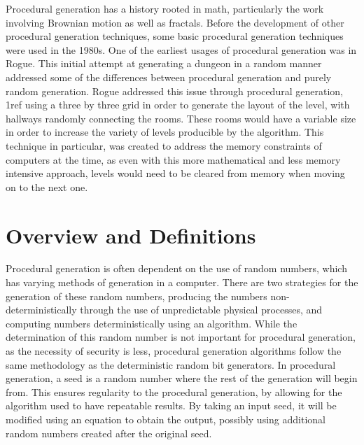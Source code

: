 \documentclass[10pt]{report}
\begin{document}
		Procedural generation has a history rooted in math, particularly the work involving Brownian motion as well as fractals. Before the development of other procedural generation techniques, some basic procedural generation techniques were used in the 1980s. One of the earliest usages of procedural generation was in Rogue. This initial attempt at generating a dungeon in a random manner addressed some of the differences between procedural generation and purely random generation. Rogue addressed this issue through procedural generation, 1ref using a three by three grid in order to generate the layout of the level, with hallways randomly connecting the rooms. These rooms would have a variable size in order to increase the variety of levels producible by the algorithm. This technique in particular, was created to address the memory constraints of computers at the time, as even with this more mathematical and less memory  intensive approach, levels would need to be cleared from memory when moving on to the next one.
		
		
		\section{Overview and Definitions}
		
		Procedural generation is often dependent on the use of random numbers, which has varying methods of generation in a computer. There are two strategies for the generation of these random numbers, producing the numbers non-deterministically through the use of unpredictable physical processes, and computing numbers deterministically using an algorithm. While the determination of this random number is not important for procedural generation, as the necessity of security is less, procedural generation algorithms follow the same methodology as the deterministic random bit generators. In procedural generation, a seed is a random number where the rest of the generation will begin from. This ensures regularity to the procedural generation, by allowing for the algorithm used to have repeatable results. By taking an input seed, it will be modified using an equation to obtain the output, possibly using additional random numbers created after the original seed.
		
\end{document}
